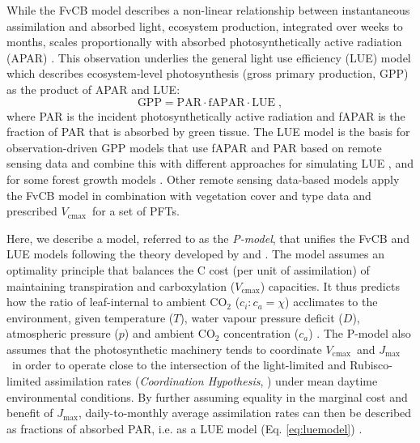 \documentclass[gmd, manuscript]{copernicus}
\newcommand{\vcmax}{$V_{\text{cmax}}$}
\newcommand{\jmax}{$J_{\text{max}}$}
\begin{document}
While the FvCB model describes a non-linear relationship between instantaneous assimilation and absorbed light, ecosystem production, integrated over weeks to months, scales proportionally with absorbed photosynthetically active radiation (APAR) \citep{monteith72, medlyn98}. This observation underlies the general light use efficiency (LUE) model which describes ecosystem-level photosynthesis (gross primary production, GPP) as the product of APAR and LUE:
\begin{equation}
\label{eq:luemodel}
\text{GPP} = \text{PAR} \cdot \text{fAPAR} \cdot \text{LUE} \;,
\end{equation}
where PAR is the incident photosynthetically active radiation and fAPAR is the fraction of PAR that is absorbed by green tissue. The LUE model is the basis for observation-driven GPP models that use fAPAR and PAR based on remote sensing data and combine this with different approaches for simulating LUE \citep{running04, Zhang2017-yr, field95rse}, and for some forest growth models \citep{landsberg97fem}. Other remote sensing data-based models \citep{jiang16rse} apply the FvCB model in combination with vegetation cover and type data and prescribed \vcmax\ for a set of PFTs.

Here, we describe a model, referred to as the \textit{P-model}, that unifies the FvCB and LUE models following the theory developed by \citet{prentice14ecollett} and \citet{wang17natpl}. The model assumes an optimality principle that balances the C cost (per unit of assimilation) of maintaining transpiration and carboxylation (\vcmax ) capacities. It thus predicts how the ratio of leaf-internal to ambient CO$_2$ ($c_i:c_a = \chi$) acclimates to the environment, given temperature ($T$), water vapour pressure deficit ($D$), atmospheric pressure ($p$) and ambient CO$_2$ concentration ($c_a$)  \citep{prentice14ecollett}. The P-model also assumes that the photosynthetic machinery tends to coordinate \vcmax\ and \jmax\ in order to operate close to the intersection of the light-limited and Rubisco-limited assimilation rates (\textit{Coordination Hypothesis}, \citet{chen93, maire12po}) under mean daytime environmental conditions. By further assuming equality in the marginal cost and benefit of \jmax , daily-to-monthly average assimilation rates can then be described as fractions of absorbed PAR, i.e. as a LUE model (Eq. \ref{eq:luemodel}) \citep{wang17natpl}.  
\end{document}
